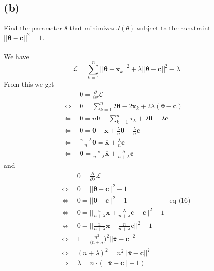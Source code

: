 \documentclass{article}
\newcommand{\PartDiv}[1]{\frac{\partial}{\partial #1}}
\begin{document}
\subsection*{(b)}
Find the parameter $\theta$ that minimizes $J(\theta)$ subject to the constraint $||\boldsymbol{\theta} - \boldsymbol{c}||^2 = 1 $.\\ \\
We have
$$
\mathcal{L} = \sum \limits _{k=1}^n ||\boldsymbol{\theta} - \boldsymbol{x}_k||^2 + \lambda ||\boldsymbol{\theta} - \boldsymbol{c}||^2 - \lambda
$$
From this we get
\begin{align}
                 &0 = \PartDiv{\theta} \mathcal{L}&\\
\Leftrightarrow~~&0 = \sum \limits _{k=1}^n 2\boldsymbol{\theta} - 2 \boldsymbol{x}_k + 2\lambda (\boldsymbol{\theta} - \boldsymbol{c})&\\
\Leftrightarrow~~&0 = n\boldsymbol{\theta} - \sum \limits _{k=1}^n  \boldsymbol{x}_k + \lambda \boldsymbol{\theta} - \lambda  \boldsymbol{c}&\\
\Leftrightarrow~~&0 = \boldsymbol{\theta} - \boldsymbol{\overline{x}} + \frac{\lambda}{n} \boldsymbol{\theta} - \frac{\lambda}{n}  \boldsymbol{c}&\\
\Leftrightarrow~~&\frac{n + \lambda}{n} \boldsymbol{\theta}  = \boldsymbol{\overline{x}} + \frac{\lambda}{n}  \boldsymbol{c}&\\
\Leftrightarrow~~&\boldsymbol{\theta}  = \frac{n}{n + \lambda}\boldsymbol{\overline{x}} + \frac{\lambda}{n + \lambda}  \boldsymbol{c}&
\end{align}
and
\begin{align}
                 &0 = \PartDiv{\lambda} \mathcal{L}&\\
\Leftrightarrow~~&0 = ||\boldsymbol{\theta} - \boldsymbol{c}||^2 - 1&\\
\Leftrightarrow~~&0 = ||\boldsymbol{\theta} - \boldsymbol{c}||^2 - 1& \text{eq (16)}\\            
\Leftrightarrow~~&0 = ||\frac{n}{n + \lambda}\boldsymbol{\overline{x}} + \frac{\lambda}{n + \lambda}  \boldsymbol{c} - \boldsymbol{c}||^2 - 1& \\
\Leftrightarrow~~&0 = ||\frac{n}{n + \lambda}\boldsymbol{\overline{x}} - \frac{n }{n + \lambda}  \boldsymbol{c} ||^2 - 1& \\
\Leftrightarrow~~&1 = \frac{n^2}{(n + \lambda})^2 ||\boldsymbol{\overline{x}} - \boldsymbol{c} ||^2&\\
\Leftrightarrow~~&(n + \lambda)^2  = n^2||\boldsymbol{\overline{x}} - \boldsymbol{c} ||^2&\\ 
\Rightarrow~~& \lambda  = n \cdot (||\boldsymbol{\overline{x}} - \boldsymbol{c} || - 1 )&
\end{align}
\end{document}
